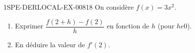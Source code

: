 \begin{exercice}{1SPE-DERLOCAL-EX-008}{1}{8}
On considère $f(x)=3x^2$.
\begin{enumerate}
  \item Exprimer $\dfrac{f(2+h)-f(2)}{h}$ en fonction de $h$ (pour $h
e 0$).
  \item En déduire la valeur de $f'(2)$.
\end{enumerate}
\end{exercice}
